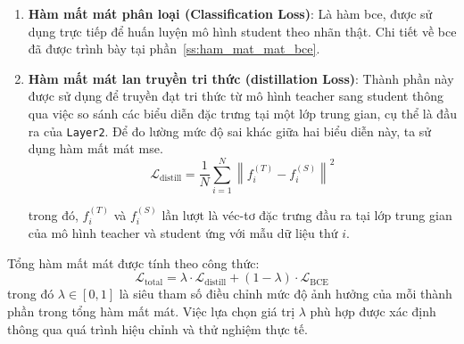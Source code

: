 \begin{enumerate}
	\item \textbf{Hàm mất mát phân loại (Classification Loss)}:
	Là hàm \gls{bce}, được sử dụng trực tiếp để huấn luyện mô hình \gls{student} theo nhãn thật. Chi tiết về \gls{bce} đã được trình bày tại phần~\ref{ss:ham_mat_mat_bce}.
	\item \textbf{Hàm mất mát lan truyền tri thức (\Gls{distillation} Loss)}:
	Thành phần này được sử dụng để truyền đạt tri thức từ mô hình \gls{teacher} sang \gls{student} thông qua việc so sánh các biểu diễn đặc trưng tại một lớp trung gian, cụ thể là đầu ra của \texttt{Layer2}. Để đo lường mức độ sai khác giữa hai biểu diễn này, ta sử dụng hàm mất mát \gls{mse}.
	\begin{equation}
		\mathcal{L}_{\mathrm{distill}} = \frac{1}{N} \sum_{i=1}^{N} \left\| f^{(T)}_i - f^{(S)}_i \right\|^2
	\end{equation}
	
	trong đó, \( f^{(T)}_i \) và \( f^{(S)}_i \) lần lượt là véc-tơ đặc trưng đầu ra tại lớp trung gian của mô hình \gls{teacher} và \gls{student} ứng với mẫu dữ liệu thứ \( i \).
		
\end{enumerate}

Tổng hàm mất mát được tính theo công thức:
\begin{equation}
	\mathcal{L}_{\mathrm{total}} = \lambda \cdot \mathcal{L}_{\mathrm{distill}} + (1 - \lambda) \cdot \mathcal{L}_{\mathrm{BCE}}
\end{equation}
trong đó \( \lambda \in [0, 1] \) là siêu tham số điều chỉnh mức độ ảnh hưởng của mỗi thành phần trong tổng hàm mất mát. Việc lựa chọn giá trị \( \lambda \) phù hợp được xác định thông qua quá trình hiệu chỉnh và thử nghiệm thực tế.
%
%
